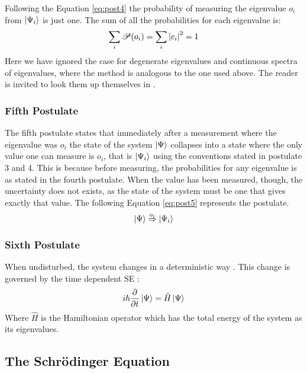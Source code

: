 \documentclass[../master_thesis.tex]{subfiles}
\begin{document}
Following the Equation \ref{eq:post4} the probability of measuring the
eigenvalue $o_i$ from $\ket{\Psi_i}$ is just one. The sum of all the probabilities
for each eigenvalue is:
\begin{equation}
  \sum_i\mathscr{P}(o_i) = \sum_i \abs{c_i}^2 = 1
\end{equation}
Here we have ignored the case for degenerate eigenvalues and continuous spectra of
eigenvalues, where the method is analogous to the one used above. The reader is
invited to look them up themselves in \cite{Cohen:1973, Atkins:2011}.

\subsubsection{Fifth Postulate}
The fifth postulate states that immediately after a measurement where the eigenvalue was $o_i$
the state of the system $\ket{\Psi}$ collapses into a state where the only value one
can measure is $o_i$, that is $ \ket{\Psi_i} $ using the conventions stated in postulate 3 and 4.
This is because before measuring, the probabilities for any eigenvalue
is as stated in the fourth postulate. When the value has been measured, though,
the uncertainty does not exists, as the state of the system must be one that gives
exactly that value. The following Equation \ref{eq:post5} represents the postulate.
\begin{equation}\label{eq:post5}
  \ket{\Psi} \stackrel{o_i}{\Rightarrow} \ket{\Psi_i}
\end{equation}

\subsubsection{Sixth Postulate}
When undisturbed, the system changes in a deterministic way \cite{Cohen:1973}.
This change is governed by the time dependent \ac{SE} \cite{Cohen:1973, Atkins:2011}:
\begin{equation}\label{eq:tdepSE}
  i\hbar\frac{\partial}{\partial t} \ket{\Psi} = \hat{H}\ket{\Psi}
\end{equation}
Where $\hat{H}$ is the Hamiltonian operator which has the total energy of the
system as its eigenvalues.

\subsection{The Schrödinger Equation}
\end{document}
